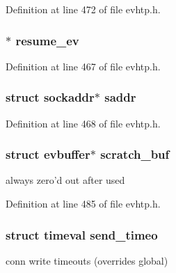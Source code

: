 Definition at line 472 of file evhtp.\-h.

\hypertarget{structevhtp__connection__s_a7a583b9c2322f322b8785b9cff0e9585}{
\subsubsection[{resume\-\_\-ev}]{$\ast$ resume\-\_\-ev}}\label{structevhtp__connection__s_a7a583b9c2322f322b8785b9cff0e9585}


Definition at line 467 of file evhtp.\-h.

\hypertarget{structevhtp__connection__s_a95957a2d67e88843dae4b71c658b6ecb}{
\subsubsection[{saddr}]{\setlength{\rightskip}{0pt plus 5cm}struct sockaddr$\ast$ saddr}}\label{structevhtp__connection__s_a95957a2d67e88843dae4b71c658b6ecb}


Definition at line 468 of file evhtp.\-h.

\hypertarget{structevhtp__connection__s_ad26039795d9657f7553e1deb2917d64c}{
\subsubsection[{scratch\-\_\-buf}]{\setlength{\rightskip}{0pt plus 5cm}struct evbuffer$\ast$ scratch\-\_\-buf}}\label{structevhtp__connection__s_ad26039795d9657f7553e1deb2917d64c}
always zero'd out after used 

Definition at line 485 of file evhtp.\-h.

\hypertarget{structevhtp__connection__s_a7ffa291d73974047489f8880e5363603}{
\subsubsection[{send\-\_\-timeo}]{\setlength{\rightskip}{0pt plus 5cm}struct timeval send\-\_\-timeo}}\label{structevhtp__connection__s_a7ffa291d73974047489f8880e5363603}
conn write timeouts (overrides global) 

